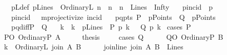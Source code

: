\begin{isabellebody}
\ \ \ pLdef{\isacharcolon}{\kern0pt}\ {\isachardoublequoteopen}pLines\ {\isasymequiv}\ {\isacharbraceleft}{\kern0pt}OrdinaryL\ n\ {\isacharbar}{\kern0pt}\ n\ {\isachardot}{\kern0pt}\ {\isacharparenleft}{\kern0pt}n\ {\isasymin}\ Lines{\isacharparenright}{\kern0pt}{\isacharbraceright}{\kern0pt}\ {\isasymunion}\ {\isacharbraceleft}{\kern0pt}Infty{\isacharbraceright}{\kern0pt}{\isachardoublequoteclose}\isanewline
\ \ \ pincid\ {\isacharparenleft}{\kern0pt}\ {\isachardoublequoteopen}p{\isasymlhd}{\isachardoublequoteclose}\ {}{}{\isacharparenright}{\kern0pt}\isanewline
\ \ \ {\isacartoucheopen}pincid\ {\isacharequal}{\kern0pt}\ \ mprojectivize\ {\isacharparenleft}{\kern0pt}incid{\isacharparenright}{\kern0pt}{\isacartoucheclose}\isanewline
\ \ \ pq{\isacharunderscore}{\kern0pt}pts{\isacharcolon}{\kern0pt}\ {\isachardoublequoteopen}P\ {\isasymin}\ pPoints\ {\isasymand}\ Q\ {\isasymin}\ pPoints{\isachardoublequoteclose}\isanewline
\ \ \ pq{\isacharunderscore}{\kern0pt}diff{\isacharcolon}{\kern0pt}{\isachardoublequoteopen}P\ {\isasymnoteq}\ Q{\isachardoublequoteclose}\isanewline
\ \ \ {\isachardoublequoteopen}{\isacharparenleft}{\kern0pt}{\isasymexists}k\ {\isachardot}{\kern0pt}\ k\ {\isasymin}\ pLines\ {\isasymand}\ P\ p{\isasymlhd}\ k\ \ {\isasymand}\ Q\ p{\isasymlhd}\ k{\isacharparenright}{\kern0pt}{\isachardoublequoteclose}\isanewline
%
\isadelimproof
%
\endisadelimproof
%
\isatagproof
{}\isamarkupfalse%
\ {\isacharparenleft}{\kern0pt}cases\ P{\isacharparenright}{\kern0pt}\isanewline
\ \ \isamarkupfalse%
\ PO{\isacharcolon}{\kern0pt}\ {\isacharparenleft}{\kern0pt}OrdinaryP\ A{\isacharparenright}{\kern0pt}\isanewline
\ \ \isamarkupfalse%
\ \isamarkupfalse%
\ {\isacharquery}{\kern0pt}thesis\ \isanewline
\ \ \isamarkupfalse%
\ {\isacharparenleft}{\kern0pt}cases\ Q{\isacharparenright}{\kern0pt}\isanewline
\ \ \ \ \isamarkupfalse%
\ QO{\isacharcolon}{\kern0pt}\ {\isacharparenleft}{\kern0pt}OrdinaryP\ B{\isacharparenright}{\kern0pt}\isanewline
\ \ \ \ \isamarkupfalse%
\ {\isacharquery}{\kern0pt}k\ {\isacharequal}{\kern0pt}\ {\isachardoublequoteopen}OrdinaryL\ {\isacharparenleft}{\kern0pt}join\ A\ B{\isacharparenright}{\kern0pt}{\isachardoublequoteclose}\isanewline
\ \ \ \ \isamarkupfalse%
\ join{\isacharunderscore}{\kern0pt}line{\isacharcolon}{\kern0pt}\ {\isachardoublequoteopen}join\ A\ B\ {\isasymin}\ Lines{\isachardoublequoteclose}\ \ \isamarkupfalse%

\end{isabellebody}

